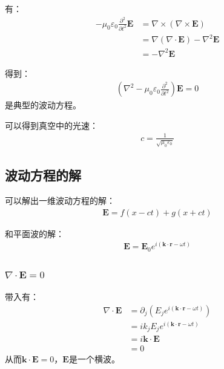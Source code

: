 \documentclass[12pt,onecolumn,a4paper]{book}
\numberwithin{table}{subsection}
\numberwithin{equation}{subsection}
\begin{document}
    有：
    \begin{align}
        - \mu_0 \varepsilon_0 \frac{\partial^2}{\partial t^2} \mathbf{E} & = \nabla \times (\nabla \times \mathbf{E})               \\
                                                                         & = \nabla (\nabla \cdot \mathbf{E}) - \nabla^2 \mathbf{E} \\
                                                                         & = - \nabla^2 \mathbf{E}
    \end{align}

    得到：
    \begin{align}
        (\nabla^2  - \mu_0 \varepsilon_0 \frac{\partial^2}{\partial t^2})\mathbf{E} = 0
    \end{align}
    是典型的波动方程。

    可以得到真空中的光速：
    \begin{align}
        c = \frac{1}{\sqrt{\mu_0 \varepsilon_0}}
    \end{align}

    \subsection{波动方程的解}
    可以解出一维波动方程的解：
    \begin{align}
        \mathbf{E} = f(x - ct)+g(x + ct)
    \end{align}

    和平面波的解：
    \begin{align}
        \mathbf{E} = \mathbf{E}_0 e^{i ( \mathbf{k} \cdot \mathbf{r}-\omega t )}
    \end{align}

    \subsubsection{$\nabla \cdot \mathbf{E} = 0$}

    带入有：
    \begin{align}
        \nabla \cdot \mathbf{E} & = \partial_j (E_j e^{i ( \mathbf{k} \cdot \mathbf{r}-\omega t )}) \\
                                & = i k_j E_j e^{i ( \mathbf{k} \cdot \mathbf{r}-\omega t )}        \\
                                & = i \mathbf{k} \cdot \mathbf{E}                                   \\
                                & = 0
    \end{align}
    从而$\mathbf{k} \cdot \mathbf{E} = 0$，$\mathbf{E}$是一个横波。
\end{document}
